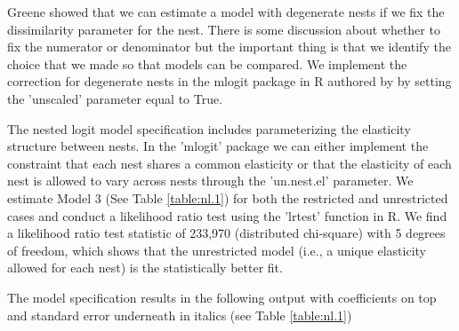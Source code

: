 \documentclass[10pt]{amsart}
\begin{document}
Greene showed that we can estimate a model with degenerate nests if we fix the dissimilarity parameter for the nest.
There is some discussion about whether to fix the numerator or denominator \parencite{} but the important thing is that we identify the choice that we made so that models can be compared. 
We implement the correction for degenerate nests in the mlogit package in R authored by \cite{mlogit2013} by setting the 'unscaled' parameter equal to True. 

The nested logit model specification includes parameterizing the elasticity structure between nests.
In the 'mlogit' package we can either implement the constraint that each nest shares a common elasticity or that the elasticity of each nest is allowed to vary across nests through the 'un.nest.el' parameter.
We estimate Model 3 (See Table \ref{table:nl.1}) for both the restricted and unrestricted cases and conduct a likelihood ratio test using the 'lrtest' function in R. 
We find a likelihood ratio test statistic of 233,970 (distributed chi-square) with 5 degrees of freedom, which shows that the unrestricted model (i.e., a unique elasticity allowed for each nest) is the statistically better fit.   

The model specification results in the following output with coefficients on top and standard error underneath in italics (see Table \ref{table:nl.1})
\end{document}
